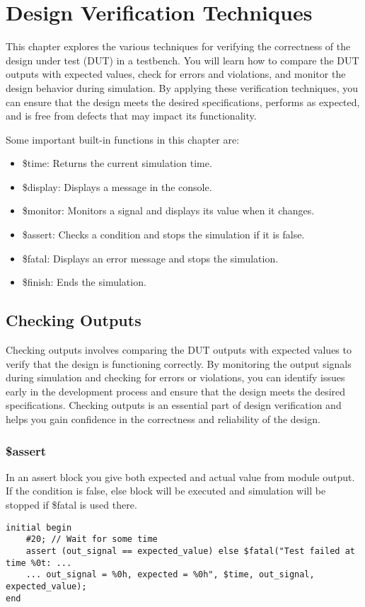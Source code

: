 \documentclass{report}
\begin{document}
\chapter{Design Verification Techniques}
This chapter explores the various techniques for verifying the correctness of the design under test (DUT) in a testbench. You will learn how to compare the DUT outputs with expected values, check for errors and violations, and monitor the design behavior during simulation. By applying these verification techniques, you can ensure that the design meets the desired specifications, performs as expected, and is free from defects that may impact its functionality.

Some important built-in functions in this chapter are:
\begin{itemize}
    \item \$time: Returns the current simulation time.
    \item \$display: Displays a message in the console.
    \item \$monitor: Monitors a signal and displays its value when it changes.
    \item \$assert: Checks a condition and stops the simulation if it is false.
    \item \$fatal: Displays an error message and stops the simulation.
    \item \$finish: Ends the simulation.
\end{itemize}
\section{Checking Outputs}
Checking outputs involves comparing the DUT outputs with expected values to verify that the design is functioning correctly. By monitoring the output signals during simulation and checking for errors or violations, you can identify issues early in the development process and ensure that the design meets the desired specifications. Checking outputs is an essential part of design verification and helps you gain confidence in the correctness and reliability of the design.

\break
\subsection{\$assert}

In an assert block you give both expected and actual value from module output. If the condition is false, else block will be executed and simulation will be stopped if \$fatal is used there.
\begin{verbatim}
initial begin
    #20; // Wait for some time
    assert (out_signal == expected_value) else $fatal("Test failed at time %0t: ...
    ... out_signal = %0h, expected = %0h", $time, out_signal, expected_value);
end
\end{verbatim}
\end{document}
